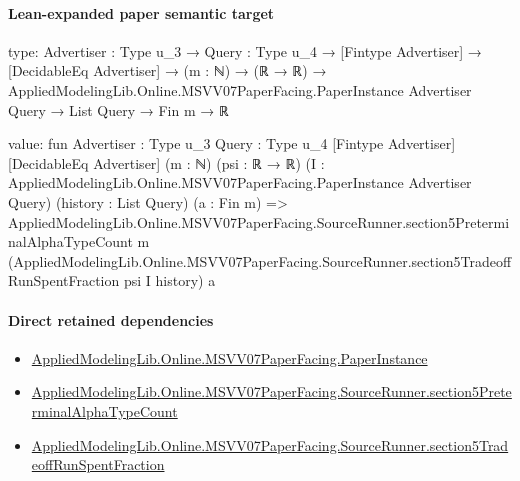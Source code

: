 \documentclass[10pt]{article}
\begin{document}
\paragraph{Lean-expanded paper semantic target}
\begin{ReviewVerbatim}
type:
{Advertiser : Type u_3} →
  {Query : Type u_4} →
    [Fintype Advertiser] →
      [DecidableEq Advertiser] →
        (m : ℕ) →
          (ℝ → ℝ) → AppliedModelingLib.Online.MSVV07PaperFacing.PaperInstance Advertiser Query → List Query → Fin m → ℝ

value:
fun {Advertiser : Type u_3} {Query : Type u_4} [Fintype Advertiser] [DecidableEq Advertiser] (m : ℕ) (psi : ℝ → ℝ)
    (I : AppliedModelingLib.Online.MSVV07PaperFacing.PaperInstance Advertiser Query) (history : List Query)
    (a : Fin m) =>
  AppliedModelingLib.Online.MSVV07PaperFacing.SourceRunner.section5PreterminalAlphaTypeCount m
    (AppliedModelingLib.Online.MSVV07PaperFacing.SourceRunner.section5TradeoffRunSpentFraction psi I history) a
\end{ReviewVerbatim}

\paragraph{Direct retained dependencies}
\begin{itemize}\raggedright
\item \hyperlink{governing-declaration-11907576ec71eeb5}{Applied\allowbreak{}Modeling\allowbreak{}Lib.\allowbreak{}Online.\allowbreak{}MSVV07\allowbreak{}Paper\allowbreak{}Facing.\allowbreak{}Paper\allowbreak{}Instance}
\item \hyperlink{governing-declaration-2a28b0fcfb5cf9f3}{Applied\allowbreak{}Modeling\allowbreak{}Lib.\allowbreak{}Online.\allowbreak{}MSVV07\allowbreak{}Paper\allowbreak{}Facing.\allowbreak{}Source\allowbreak{}Runner.\allowbreak{}section5\allowbreak{}Preterminal\allowbreak{}Alpha\allowbreak{}Type\allowbreak{}Count}
\item \hyperlink{governing-declaration-a8cb559fe4bcc02f}{Applied\allowbreak{}Modeling\allowbreak{}Lib.\allowbreak{}Online.\allowbreak{}MSVV07\allowbreak{}Paper\allowbreak{}Facing.\allowbreak{}Source\allowbreak{}Runner.\allowbreak{}section5\allowbreak{}Tradeoff\allowbreak{}Run\allowbreak{}Spent\allowbreak{}Fraction}
\end{itemize}
\end{document}

